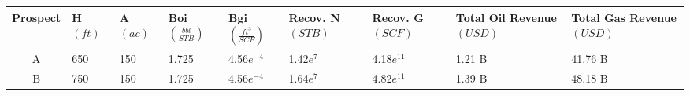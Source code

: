 \begin{tabularx}{\linewidth}{C *{8}{L}}
    \toprule
    Prospect &
    H $(ft)$ &
    A $(ac)$ &
    Boi $(\frac{bbl}{STB})$ &
    Bgi $(\frac{ft^3}{SCF})$ &
    Recov. N $(STB)$ &
    Recov. G $(SCF)$ &
    Total Oil Revenue $(USD)$ &
    Total Gas Revenue $(USD)$ \\
    
    \midrule
    A & 650 & 150 & 1.725 & 4.56$e^{-4}$ & 1.42$e^7$ & 4.18$e^{11}$ & 1.21 B & 41.76 B \\
    B & 750 & 150 & 1.725 & 4.56$e^{-4}$ & 1.64$e^7$ & 4.82$e^{11}$ & 1.39 B & 48.18 B \\
    \bottomrule
\end{tabularx}